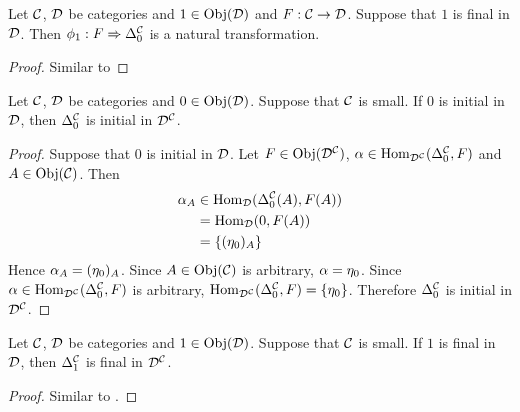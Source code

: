 \documentclass{book}
\begin{document}
	\begin{ex} 
		Let $\mathcal{C}$, $\mathcal{D}$ be categories and $1 \in \operatorname{Obj}(\mathcal{D})$ and $F: \mathcal{C} \rightarrow \mathcal{D}$. Suppose that $1$ is final in $\mathcal{D}$. Then $\phi_{1}: F \Rightarrow \Delta^{\mathcal{C}}_0$ is a natural transformation.
	\end{ex}

	\begin{proof}
		Similar to 
	\end{proof}
	
	\begin{ex} 
		Let $\mathcal{C}$, $\mathcal{D}$ be categories and $0 \in \operatorname{Obj}(\mathcal{D})$. Suppose that $\mathcal{C}$ is small. If $0$ is initial in $\mathcal{D}$, then $\Delta^{\mathcal{C}}_0$ is initial in $\mathcal{D}^{\mathcal{C}}$. 
	\end{ex}

	\begin{proof}
		Suppose that $0$ is initial in $\mathcal{D}$. Let $F \in \operatorname{Obj}(\mathcal{D}^{\mathcal{C}})$, $\alpha \in \operatorname{Hom}_{\mathcal{D}^{\mathcal{C}}}(\Delta^{\mathcal{C}}_0, F)$ and $A \in \operatorname{Obj}(\mathcal{C})$. Then
		\begin{align*}
			\alpha_A 
			& \in \operatorname{Hom}_{\mathcal{D}}(\Delta^{\mathcal{C}}_0(A), F(A)) \\
			& =  \operatorname{Hom}_{\mathcal{D}}(0, F(A)) \\
			& = \{(\eta_0)_A\}
		\end{align*}
		Hence $\alpha_A = (\eta_0)_A$. Since $A \in \operatorname{Obj}(\mathcal{C})$ is arbitrary, $\alpha = \eta_0$. Since $\alpha \in  \operatorname{Hom}_{\mathcal{D}^{\mathcal{C}}}(\Delta^{\mathcal{C}}_0, F)$ is arbitrary, $ \operatorname{Hom}_{\mathcal{D}^{\mathcal{C}}}(\Delta^{\mathcal{C}}_0, F) = \{\eta_0\}$. Therefore $\Delta^{\mathcal{C}}_0$ is initial in $\mathcal{D}^{\mathcal{C}}$.
	\end{proof}


	\begin{ex} 
		Let $\mathcal{C}$, $\mathcal{D}$ be categories and $1 \in \operatorname{Obj}(\mathcal{D})$. Suppose that $\mathcal{C}$ is small. If $1$ is final in $\mathcal{D}$, then $\Delta^{\mathcal{C}}_1$ is final in $\mathcal{D}^{\mathcal{C}}$. 
	\end{ex}

	\begin{proof}
		Similar to .
	\end{proof}
	
\end{document}
